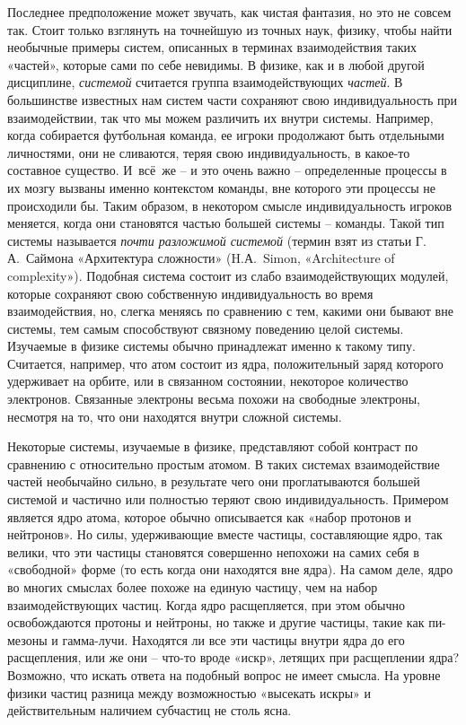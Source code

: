 \documentclass[../main.tex]{subfiles}
\begin{document}
Последнее предположение может звучать, как чистая фантазия, но это не совсем так. Стоит только взглянуть на точнейшую из точных наук, физику, чтобы найти необычные примеры систем, описанных в терминах взаимодействия таких «частей», которые сами по себе невидимы. В физике, как и в любой другой дисциплине, \emph{системой} считается группа взаимодействующих \emph{частей}. В большинстве известных нам систем части сохраняют свою индивидуальность при взаимодействии, так что мы можем различить их внутри системы. Например, когда собирается футбольная команда, ее игроки продолжают быть отдельными личностями, они не сливаются, теряя свою индивидуальность, в какое-то составное существо. И~всё~же \--- и это очень важно \--- определенные процессы в их мозгу вызваны именно контекстом команды, вне которого эти процессы не происходили бы. Таким образом, в некотором смысле индивидуальность игроков меняется, когда они становятся частью большей системы \--- команды. Такой тип системы называется \emph{почти разложимой системой} (термин взят из статьи Г.\,А.~Саймона «Архитектура сложности» (H.А.~Simon, «Architecture of complexity»). Подобная система состоит из слабо взаимодействующих модулей, которые сохраняют свою собственную индивидуальность во время взаимодействия, но, слегка меняясь по сравнению с тем, какими они бывают вне системы, тем самым способствуют связному поведению целой системы. Изучаемые в физике системы обычно принадлежат именно к такому типу. Считается, например, что атом состоит из ядра, положительный заряд которого удерживает на орбите, или в связанном состоянии, некоторое количество электронов. Связанные электроны весьма похожи на свободные электроны, несмотря на то, что они находятся внутри сложной системы.

Некоторые системы, изучаемые в физике, представляют собой контраст по сравнению с относительно простым атомом. В таких системах взаимодействие частей необычайно сильно, в результате чего они проглатываются большей системой и частично или полностью теряют свою индивидуальность. Примером является ядро атома, которое обычно описывается как «набор протонов и нейтронов». Но силы, удерживающие вместе частицы, составляющие ядро, так велики, что эти частицы становятся совершенно непохожи на самих себя в «свободной» форме (то есть когда они находятся вне ядра). На самом деле, ядро во многих смыслах более похоже на единую частицу, чем на набор взаимодействующих частиц. Когда ядро расщепляется, при этом обычно освобождаются протоны и нейтроны, но также и другие частицы, такие как пи-мезоны и гамма-лучи. Находятся ли все эти частицы внутри ядра до его расщепления, или же они \--- что-то вроде «искр», летящих при расщеплении ядра? Возможно, что искать ответа на подобный вопрос не имеет смысла. На уровне физики частиц разница между возможностью «высекать искры» и действительным наличием субчастиц не столь ясна.
\end{document}
